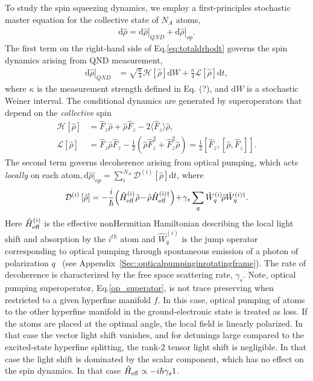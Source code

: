 \documentclass[aps,pra,twocolumn,superscriptaddress]{revtex4-1} %
\newcommand{\expect}[1]{\big\langle #1 \big\rangle}
\begin{document}
To study the spin squeezing dynamics, we employ a first-principles stochastic master equation for the collective state of $N_A$ atoms,
\begin{align}\label{eq:totaldrhodt}
\mathrm{d}\hat{\rho}= \left.\mathrm{d}\hat{\rho}\right|_{QND}+\left.\mathrm{d}\hat{\rho}\right|_{op}.
\end{align}
The first term on the right-hand side of Eq.\eqref{eq:totaldrhodt} governs the spin dynamics arising from QND measurement,
\begin{align}
\left.\mathrm{d}\hat{\rho}\right|_{QND} &= \sqrt{\frac{\kappa}{4}}\mathcal{H}\left[\hat{\rho} \right]\mathrm{d}W + \frac{\kappa}{4}\mathcal{L}\left[ \hat{\rho}\right]\mathrm{d}t,
\end{align}
where  $\kappa$ is the measurement strength defined in Eq. (?), and $\mathrm{d}W$ is a stochastic Weiner interval. The conditional dynamics are generated by superoperators that depend on the {\em collective} spin
\begin{subequations}
\begin{align}
\mathcal{H}\left[ \hat{\rho}\right] &= \hat{F}_z \hat{\rho} + \hat{\rho}\hat{F}_z -2\expect{\hat{F}_z}\hat{\rho}, \\
\mathcal{L}\left[ \hat{\rho} \right] &= \hat{F}_z \hat{\rho}\hat{F}_z \!-\!\frac{1}{2}\!\left(\hat{\rho}\hat{F}_z^2\!+\!\hat{F}_z^2\hat{\rho} \right)\!=\!\frac{1}{2}\!\left[\hat{F}_z,\left[\hat{\rho},\hat{F}_z \right] \right].
\end{align}
\end{subequations}
The second term governs decoherence arising from optical pumping, which acts {\em locally} on each atom$,\mathrm{d}\hat{\rho}|_{op}=\sum_i^{N_A} \mathcal{D}^{(i)}\left[ \hat{\rho}\right] \mathrm{d}t$, where
\begin{equation}
\mathcal{D}^{(i)}\left[ \hat{\rho}\right] = -\frac{i}{\hbar}\!\left(\hat{H}^{(i)}_{\rm eff}\hat{\rho} \!-\! \hat{\rho} \hat{H}^{(i)\dag}_{\rm eff}\right) \!+\! \gamma_s\sum_q \hat{W}^{(i)}_q\! \hat{\rho}\hat{W}^{(i)\dag}_q.
\label{op_superator}
\end{equation}
Here $\hat{H}^{(i)}_{\rm eff}$ is the effective nonHermitian Hamiltonian describing the local light shift and absorption by the $i^{th}$ atom and $\hat{W}^{(i)}_q$ is the jump operator corresponding to optical pumping through spontaneous emission of a photon of polarization $q$~\cite{Deutsch2010a} (see Appendix~\ref{Sec::opticalpumpinginrotatingframe}).
The rate of decoherence is characterized by the free space scattering rate, $\gamma_s$.  Note, optical pumping superoperator, Eq.\eqref{op_superator},  is not trace preserving when restricted to a given hyperfine manifold $f$.  In this case, optical pumping of atoms to the other hyperfine manifold in the ground-electronic state is treated as loss.  If the atoms are placed at the optimal angle, the local field is linearly polarized.  In that case the vector light shift vanishes, and for detunings large compared to the excited-state hyperfine splitting, the rank-2 tensor light shift is negligible.  In that case the light shift is dominated by the scalar component, which has no effect on the spin dynamics.  In that case $\hat{H}_{\rm eff} \propto -i\hbar \gamma_s 1$.
\end{document}
